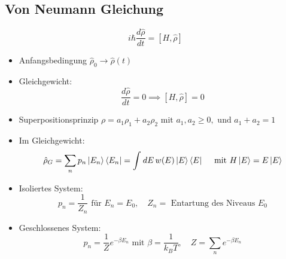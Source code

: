 \documentclass[11pt]{article}
\theoremstyle{plain}
\theoremstyle{mytheoremstyle}
\begin{document}
\subsection*{Von Neumann Gleichung}
\[ i \hbar \frac{d\hat{\rho}}{dt} = \left[ H, \hat{\rho} \right] \] 
\begin{itemize}
  \item Anfangsbedingung $\hat{\rho}_0 \to  \hat{\rho}(t)$
  \item Gleichgewicht: \[ \frac{d \hat{\rho}}{dt}=0 \implies  \left[ H, \hat{\rho} \right]=0  \] 
  \item Superpositionsprinzip $\rho= a_1 \rho_1 + a_2 \rho_2 \text{ mit }
    a_1, a_2 \ge 0, \text{ und } a_1+a_2 =1 $
  \item Im Gleichgewicht: \[ \hat{\rho}_G = \sum_{n}^{} p_n \Ket{E_n}\Bra{E_n}
    = \int_{}^{} dE\, w(E)\Ket{E}\Bra{E} \quad \text{ mit }
    H \Ket{E}= E \Ket{E}\] 
  \item Isoliertes System: \[ p_n = \frac{1}{Z_n} \text{ f\"ur } E_n = E_0,
    \quad Z_n= \text{ Entartung des Niveaus } E_0 \] 
  \item Geschlossenes System: \[ p_n = \frac{1}{Z} e^{-\beta E_n} \text{ mit } 
    \beta= \frac{1}{k_B T}, \quad Z=\sum_{n}^{} e^{-\beta E_n} \] 
\end{itemize}
\end{document}
